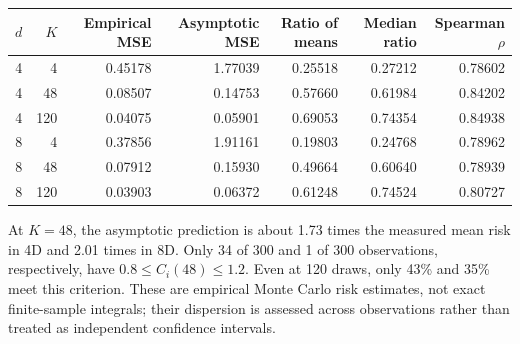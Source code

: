 \documentclass[11pt,letterpaper]{article}
\begin{document}
\begin{center}\small
\begin{tabular}{@{}rr rrr rr@{}}
\toprule
$d$ & $K$ & Empirical MSE & Asymptotic MSE & Ratio of means & Median ratio & Spearman $\rho$\\
\midrule
4&4&0.45178&1.77039&0.25518&0.27212&0.78602\\
4&48&0.08507&0.14753&0.57660&0.61984&0.84202\\
4&120&0.04075&0.05901&0.69053&0.74354&0.84938\\
8&4&0.37856&1.91161&0.19803&0.24768&0.78962\\
8&48&0.07912&0.15930&0.49664&0.60640&0.78939\\
8&120&0.03903&0.06372&0.61248&0.74524&0.80727\\
\bottomrule
\end{tabular}
\label{tab:risk}
\end{center}
At $K=48$, the asymptotic prediction is about 1.73 times the measured mean risk in 4D and 2.01 times in 8D. Only 34 of 300 and 1 of 300 observations, respectively, have $0.8\leq C_i(48)\leq1.2$. Even at 120 draws, only 43\% and 35\% meet this criterion. These are empirical Monte Carlo risk estimates, not exact finite-sample integrals; their dispersion is assessed across observations rather than treated as independent confidence intervals.
\clearpage
\end{document}
